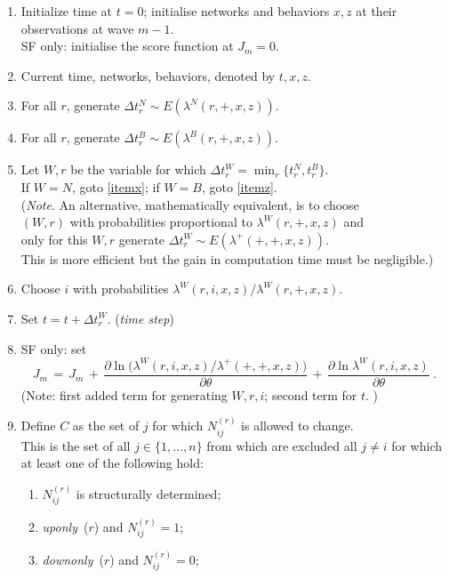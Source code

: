 \documentclass[a4paper,12pt,fleqn]{article}
\newcommand{\nnm}[1]{\textsf{\small\textit{#1}\ }}
\begin{document}
\begin{enumerate}
\item Initialize  time at $t=0$; initialise networks and behaviors $x, z$ at
      their observations at wave $m-1$.\\
      SF only: initialise the score function at $J_m = 0$.
\item \label{itemstart}
      Current time, networks, behaviors, denoted by $t, x, z$.
\item For all $r$, generate $\Delta t^N_r \sim E(\lambda^N(r,+,x,z))$.
\item For all $r$, generate $\Delta t^B_r \sim E(\lambda^B(r,+,x,z))$.
\item Let $W, r$ be the variable for which $\Delta t^W_r = \min_r\{t^N_r, t^B_r \}$.\\
      If $W = N$, goto \ref{itemx}; if $W = B$, goto \ref{itemz}.\\
      (\emph{Note}. An alternative, mathematically equivalent, is to choose\\
      $(W, r)$ with probabilities proportional to $\lambda^W(r,+,x,z)$ and\\
      only for this $W, r$ generate $\Delta t^W_r \sim E(\lambda^+(+,+,x,z))$.\\
      This is more efficient but the gain in computation time must be negligible.)
\item Choose $i$ with probabilities $\lambda^W(r,i,x,z) / \lambda^W(r,+,x,z)$.
\item Set $t = t + \Delta t^W_r$. (\emph{time step})
\item SF only:
      set
      \[
      J_m \,=\, J_m \,+\,
         \frac{\partial \ln \big(\lambda^W(r,i,x,z)/\lambda^+(+,+,x,z)\big)}
               {\partial \theta} \,+\,
         \frac{\partial \ln \lambda^W(r,i,x,z) }{ \partial \theta} \ .
      \]
      (Note: first added term for generating $W, r, i$; second term for $t$. )
\item \label{itemx}
      Define $C$ as the set of $j$ for which $N_{ij}^{(r)}$ is allowed to change.\\
      This is the set of all $j \in \{1, \ldots, n\}$ from which are excluded
      all $j \neq i$ for which at least one of the following hold:
      \begin{enumerate}
      \item $N_{ij}^{(r)} $ is structurally determined;
      \item \nnm{uponly}($r$) and $N_{ij}^{(r)} = 1$;
      \item \nnm{downonly}($r$) and $N_{ij}^{(r)} = 0$;

\end{enumerate}
\end{enumerate}
\end{document}
